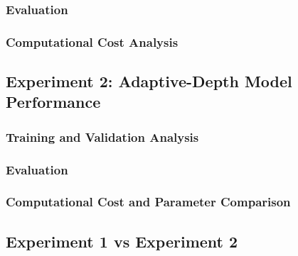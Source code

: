         \subsubsection{Evaluation}

        \subsubsection{Computational Cost Analysis}

    \subsection{Experiment 2: Adaptive-Depth Model Performance}
        \subsubsection{Training and Validation Analysis}

        \subsubsection{Evaluation}

        \subsubsection{Computational Cost and Parameter Comparison}

    \subsection{Experiment 1 vs Experiment 2}
